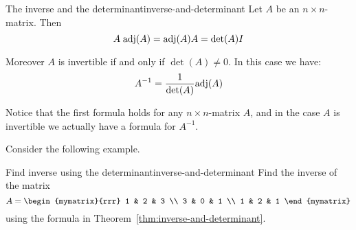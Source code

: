 \begin{theorem}{The inverse and the determinant}{inverse-and-determinant}
Let $A$ be an  $n\times n$-matrix. Then  
\begin{equation*}
A \; \mbox{\rm adj}(A) = \mbox{\rm adj}(A)A = {\det (A)} I
\end{equation*}

Moreover $A$ is invertible if and only if  $\det (A) \neq 0$. In this case we have: 
\begin{equation*}
A^{-1} = \frac{1}{\det (A)}  \mbox{\rm adj}(A)
\end{equation*}
\end{theorem}


Notice that the first formula holds for any $n \times n$-matrix $A$, and in the case $A$ is invertible we actually have a formula for $A^{-1}$.

Consider the following example.

\begin{example}{Find inverse using the determinant}{inverse-and-determinant}
Find the inverse of the matrix
\begin{equation*}
A=\begin{mymatrix}{rrr}
1 & 2 & 3 \\
3 & 0 & 1 \\
1 & 2 & 1
\end{mymatrix}
\end{equation*}
using the formula in Theorem~\ref{thm:inverse-and-determinant}.
\end{example}

